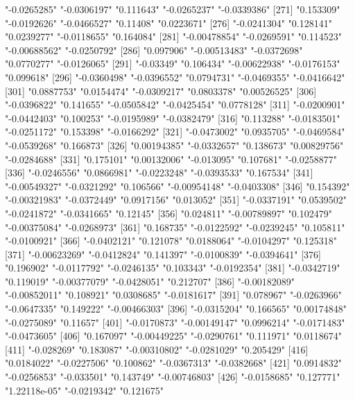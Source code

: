 \begin{Schunk}
\begin{Soutput}
[266] "-0.0265285"   "-0.0306197"   "0.111643"     "-0.0265237"   "-0.0339386"  
[271] "0.153309"     "-0.0192626"   "-0.0466527"   "0.11408"      "0.0223671"   
[276] "-0.0241304"   "0.128141"     "0.0239277"    "-0.0118655"   "0.164084"    
[281] "-0.00478854"  "-0.0269591"   "0.114523"     "-0.00688562"  "-0.0250792"  
[286] "0.097906"     "-0.00513483"  "-0.0372698"   "0.0770277"    "-0.0126065"  
[291] "-0.03349"     "0.106434"     "-0.00622938"  "-0.0176153"   "0.099618"    
[296] "-0.0360498"   "-0.0396552"   "0.0794731"    "-0.0469355"   "-0.0416642"  
[301] "0.0887753"    "0.0154474"    "-0.0309217"   "0.0803378"    "0.00526525"  
[306] "-0.0396822"   "0.141655"     "-0.0505842"   "-0.0425454"   "0.0778128"   
[311] "-0.0200901"   "-0.0442403"   "0.100253"     "-0.0195989"   "-0.0382479"  
[316] "0.113288"     "-0.0183501"   "-0.0251172"   "0.153398"     "-0.0166292"  
[321] "-0.0473002"   "0.0935705"    "-0.0469584"   "-0.0539268"   "0.166873"    
[326] "0.00194385"   "-0.0332657"   "0.138673"     "0.00829756"   "-0.0284688"  
[331] "0.175101"     "0.00132006"   "-0.013095"    "0.107681"     "-0.0258877"  
[336] "-0.0246556"   "0.0866981"    "-0.0223248"   "-0.0393533"   "0.167534"    
[341] "-0.00549327"  "-0.0321292"   "0.106566"     "-0.00954148"  "-0.0403308"  
[346] "0.154392"     "-0.00321983"  "-0.0372449"   "0.0917156"    "0.013052"    
[351] "-0.0337191"   "0.0539502"    "-0.0241872"   "-0.0341665"   "0.12145"     
[356] "0.024811"     "-0.00789897"  "0.102479"     "-0.00375084"  "-0.0268973"  
[361] "0.168735"     "-0.0122592"   "-0.0239245"   "0.105811"     "-0.0100921"  
[366] "-0.0402121"   "0.121078"     "0.0188064"    "-0.0104297"   "0.125318"    
[371] "-0.00623269"  "-0.0412824"   "0.141397"     "-0.0100839"   "-0.0394641"  
[376] "0.196902"     "-0.0117792"   "-0.0246135"   "0.103343"     "-0.0192354"  
[381] "-0.0342719"   "0.119019"     "-0.00377079"  "-0.0428051"   "0.212707"    
[386] "-0.00182089"  "-0.00852011"  "0.108921"     "0.0308685"    "-0.0181617"  
[391] "0.078967"     "-0.0263966"   "-0.0647335"   "0.149222"     "-0.00466303" 
[396] "-0.0315204"   "0.166565"     "0.00174848"   "-0.0275089"   "0.11657"     
[401] "-0.0170873"   "-0.00149147"  "0.0996214"    "-0.0171483"   "-0.0473605"  
[406] "0.167097"     "-0.00449225"  "-0.0290761"   "0.111971"     "0.0118674"   
[411] "-0.028269"    "0.183087"     "-0.00310802"  "-0.0281029"   "0.205429"    
[416] "0.0184022"    "-0.0227506"   "0.100862"     "-0.0367313"   "-0.0382668"  
[421] "0.0914832"    "-0.0256853"   "-0.033501"    "0.143749"     "-0.00746803" 
[426] "-0.0158685"   "0.127771"     "1.22118e-05"  "-0.0219342"   "0.121675"    

\end{Soutput}
\end{Schunk}
